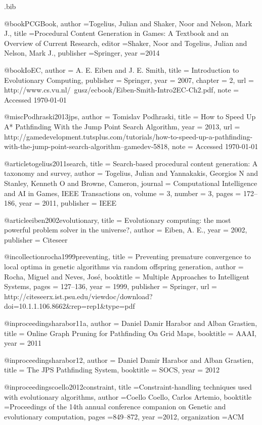 \begin{filecontents*}{\jobname.bib}

@book{PCGBook,
	author	={Togelius, Julian and Shaker, Noor and Nelson, Mark J.},
	title		={{P}rocedural {C}ontent {G}eneration in {G}ames: {A} {T}extbook and an {O}verview of {C}urrent {R}esearch},
	editor		={Shaker, Noor and Togelius, Julian and Nelson, Mark J.},
	publisher	={Springer},
	year		={2014}
}

@book{IoEC,
	author 	= {A. E. Eiben and J. E. Smith},
	title 		= {{I}ntroduction to {E}volutionary {C}omputing},
	publisher 	= {Springer},
	year 		= {2007},
	chapter	= {2},
	url 		= {http://www.cs.vu.nl/~gusz/ecbook/Eiben-Smith-Intro2EC-Ch2.pdf},
	note		= {Accessed \today}
}

@misc{Podhraski2013jps,
	author 	= {Tomislav Podhraski},
	title 		= {{H}ow to {S}peed {U}p {A}* {P}athfinding {W}ith the {J}ump {P}oint {S}earch {A}lgorithm},
	year 		= {2013}, 
	url 		= {http://gamedevelopment.tutsplus.com/tutorials/how-to-speed-up-a-pathfinding-with-the-jump-point-search-algorithm--gamedev-5818},
	note		= {Accessed \today}
}

@article{togelius2011search,
	title		= {Search-based procedural content generation: A taxonomy and survey},
	author	= {Togelius, Julian and Yannakakis, Georgios N and Stanley, Kenneth O and Browne, Cameron},
	journal	= {{C}omputational {I}ntelligence and {A}{I} in {G}ames, {I}{E}{E}{E} {T}ransactions on},
	volume	= {3},
	number	= {3},
	pages		= {172--186},
	year		= {2011},
	publisher	= {IEEE}
}

@article{eiben2002evolutionary,
	title		= {{E}volutionary {c}omputing: {t}he {m}ost {p}owerful {p}roblem {s}olver in the {u}niverse?},
	author	= {Eiben, A. E.},
	year		= {2002},
	publisher	= {Citeseer}
}

@incollection{rocha1999preventing,
	title		= {{P}reventing {p}remature {c}onvergence to {l}ocal {o}ptima in {g}enetic {a}lgorithms via {r}andom {o}ffspring {g}eneration},
	author	= {Rocha, Miguel and Neves, Jos{\'e}},
	booktitle	= {Multiple Approaches to Intelligent Systems},
	pages		= {127--136},
	year		= {1999},
	publisher	= {Springer},
	url 		= {http://citeseerx.ist.psu.edu/viewdoc/download?doi=10.1.1.106.8662&rep=rep1&type=pdf}
}

@inproceedings{harabor11a,
	author	= {Daniel Damir Harabor and Alban Grastien},
	title     	= {{O}nline {G}raph {P}runing for {P}athfinding {O}n {G}rid {M}aps},
	booktitle 	= {AAAI},
	year      	= {2011}
}

@inproceedings{harabor12,
	author    	= {Daniel Damir Harabor and Alban Grastien},
	title     	= {{T}he {J}{P}{S} {P}athfinding {S}ystem},
	booktitle 	= {SOCS},
	year      	= {2012}
}

@inproceedings{coello2012constraint,
	title		={{C}onstraint-{h}andling {t}echniques used with {e}volutionary {a}lgorithms},
	author	={Coello Coello, Carlos Artemio},
	booktitle	={Proceedings of the 14th annual conference companion on Genetic and evolutionary computation},
	pages		={849--872},
	year		={2012},
	organization	={ACM}
}


\end{filecontents*}

